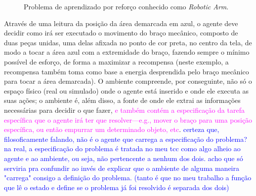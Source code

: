 \documentclass[cic,tc]{iiufrgs}
\newcommand\bruno[1]{\textcolor{magenta}{#1}}
\newcommand\henrique[1]{\textcolor{blue}{#1}}
\begin{document}
    \begin{figure}[h]
        \caption{Problema de aprendizado por reforço conhecido como \textit{Robotic Arm}.}
        \begin{center}
        \end{center}
        \label{fig:roboticarm}
    \end{figure}
    
    Através de uma leitura da posição da área demarcada em azul, o agente deve decidir como irá ser executado o movimento do braço mecânico, composto
    de duas peças unidas, uma delas afixada no ponto de cor preta, no centro da tela, de modo a tocar a área azul com a extremidade do braço, fazendo
    sempre o mínimo possível de esforço, de forma a maximizar a recompensa (neste exemplo, a recompensa também toma como base a energia desprendida pelo
    braço mecânico para tocar a área demarcada). O ambiente compreende, por conseguinte, não só o espaço físico (real ou simulado) onde o agente está inserido e onde ele
    executa as suas ações; o ambiente é, além disso, a fonte de onde ele extrai as informações necessárias para decidir o que fazer,
    \bruno{e também contém a especificação da tarefa específica que o agente irá ter que resolver---e.g., mover o braço para uma posição específica, ou então empurrar um determinado objeto, etc}.
    \henrique{certeza que, filosoficamente falando, não é o agente que carrega a especificação do problema? na real, a especificação do problema é tratada no meu tcc como algo
    alheio ao agente e ao ambiente, ou seja, não pertencente a nenhum dos dois. acho que só serviria pra confundir ao invés de explicar que o ambiente de alguma maneira "carrega" consigo a definição do problema.
     (tanto é que no meu trabalho a função que lê o estado e define se o problema já foi resolvido é separada dos dois)}
    
\end{document}
